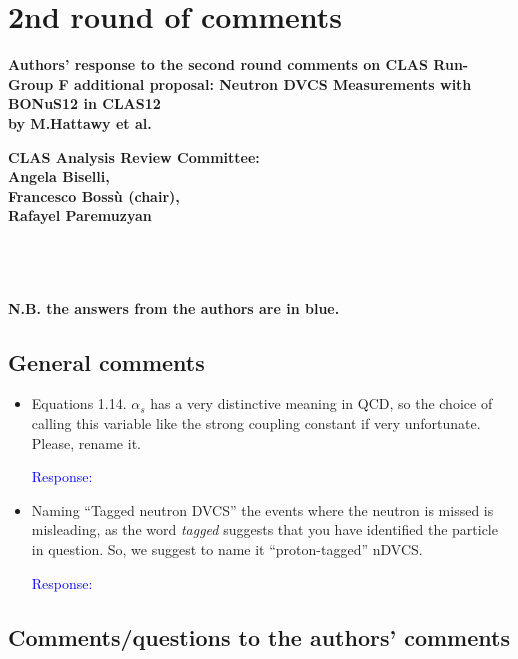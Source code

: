 \chapter{2nd round of comments}
{\bf Authors' response to the second round comments on CLAS Run-Group F 
additional proposal: Neutron DVCS Measurements with BONuS12 in CLAS12 \\ by 
M.Hattawy et al.}
\author{Angela Biselli, Francesco Boss\`u (chair), Rafayel Paremuzyan\\CLAS 
Analysis Review Committee}

{\center \bf CLAS Analysis Review Committee:\\Angela Biselli,\\ Francesco 
Boss\`u (chair),\\ Rafayel Paremuzyan\\}


\def \rarr {\ensuremath{\rightarrow}}
~\\
~\\
~\\

{\bf N.B. the answers from the authors are in blue.} \\ 
 
 \section*{General comments}
 \begin{itemize}
  \item Equations 1.14. $\alpha_s$ has a very distinctive meaning in QCD, so 
     the choice of calling this variable like the strong coupling constant if 
       very unfortunate. Please, rename it.
  
  \textcolor{blue}{Response: }


\item Naming ``Tagged neutron DVCS'' the events where the neutron is missed is 
   misleading, as the word \textit{tagged} suggests that you have identified 
       the particle in question. So, we suggest to name it ``proton-tagged'' 
       nDVCS.

 
  \textcolor{blue}{Response: }
 
 \end{itemize}

 
 
 \section*{Comments/questions to  the authors' comments}
 
